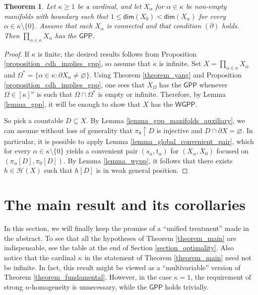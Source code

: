 \documentclass{amsart}
\theoremstyle{plain}
\newtheorem{theorem}{Theorem}[section]
\theoremstyle{definition}
\newcommand{\re}{\upharpoonright}
\newcommand{\dime}{\mathsf{dim}}
\newcommand{\GPP}{\mathsf{GPP}}
\newcommand{\WGPP}{\mathsf{WGPP}}
\newcommand{\HH}{\mathcal{H}}
\begin{document}
\begin{theorem}\label{theorem_gpp_manifolds}
Let $\kappa\geq 1$ be a cardinal, and let $X_\alpha$ for $\alpha\in\kappa$ be non-empty manifolds with boundary such that $1\leq\dime(X_0)<\dime(X_\alpha)$ for every $\alpha\in\kappa\setminus\{0\}$. Assume that each $X_\alpha$ is connected and that condition $(\partial)$ holds. Then $\prod_{\alpha\in\kappa}X_{\alpha}$ has the $\GPP$.
\end{theorem}
\begin{proof}
If $\kappa$ is finite, the desired results follows from Proposition \ref{proposition_cdh_implies_gpp}, so assume that $\kappa$ is infinite. Set $X=\prod_{\alpha\in\kappa}X_{\alpha}$ and $\Omega^\ast=\{\alpha\in\kappa:\partial X_\alpha\neq\varnothing\}$. Using Theorem \ref{theorem_yang} and Proposition \ref{proposition_cdh_implies_gpp}, one sees that $X_\Omega$ has the $\GPP$ whenever $\Omega\in [\kappa]^\omega$ is such that $\Omega\cap\Omega^\ast$ is empty or infinite. Therefore, by Lemma \ref{lemma_gpp}, it will be enough to show that $X$ has the $\WGPP$.

So pick a countable $D\subseteq X$. By Lemma \ref{lemma_gpp_manifolds_auxiliary}, we can assume without loss of generality that $\pi_0\re D$ is injective and $D\cap\partial X=\varnothing$. In particular, it is possible to apply Lemma \ref{lemma_global_convenient_pair}, which for every $\alpha\in\kappa\setminus\{0\}$ yields a convenient pair $(s_\alpha,t_\alpha)$ for $(X_\alpha,X_0)$ focused on $(\pi_\alpha[D],\pi_0[D])$. By Lemma \ref{lemma_wgpp}, it follows that there exists $h\in\HH(X)$ such that $h[D]$ is in weak general position.
\end{proof}

\section{The main result and its corollaries}\label{section_main}

In this section, we will finally keep the promise of a ``unified treatment'' made in the abstract. To see that all the hypotheses of Theorem \ref{theorem_main} are indispensable, see the table at the end of Section \ref{section_optimality}. Also notice that the cardinal $\kappa$ in the statement of Theorem \ref{theorem_main} need not be infinite. In fact, this result might be viewed as a ``multivariable'' version of Theorem \ref{theorem_fundamental}. However, in the case $\kappa=1$, the requirement of strong $n$-homogeneity is unnecessary, while the $\GPP$ holds trivially.
\end{document}
